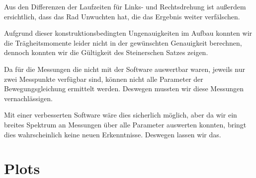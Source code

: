 \documentclass[a4paper,german,12pt,smallheadings]{scrartcl}
\begin{document}
Aus den Differenzen der Laufzeiten für Links- und Rechtsdrehung ist außerdem
ersichtlich, dass das Rad Unwuchten hat, die das Ergebnis weiter verfälschen.

Aufgrund dieser konstruktionsbedingten Ungenauigkeiten im Aufbau konnten wir
die Trägheitsmomente leider nicht in der gewünschten Genauigkeit berechnen,
dennoch konnten wir die Gültigkeit des Steinerschen Satzes zeigen.


Da für die Messungen die nicht mit der Software auswertbar waren, jeweils nur
zwei Messpunkte verfügbar sind, können nicht alle Parameter der
Bewegungsgleichung ermittelt werden. Deswegen mussten wir diese Messungen
vernachlässigen.

Mit einer verbesserten Software wäre dies sicherlich möglich, aber da wir ein
breites Spektrum an Messungen über alle Parameter auswerten konnten, bringt
dies wahrscheinlich keine neuen Erkenntnisse. Deswegen lassen wir das.

\section{Plots}

\end{document}
